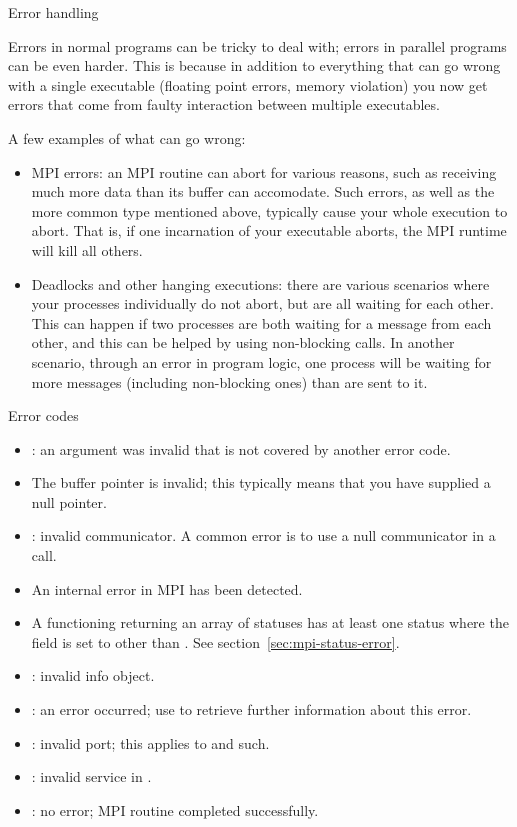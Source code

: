  {Error handling}
\label{sec:mpi:error}

Errors in normal programs can be tricky to deal with; errors in
parallel programs can be even harder. This is because in addition to
everything that can go wrong with a single executable (floating point
errors, memory violation) you now get errors that come from faulty
interaction between multiple executables.

A few examples of what can go wrong:
\begin{itemize}
\item MPI errors: an MPI routine can abort for various reasons, such
  as receiving much more data than its buffer can accomodate. Such
  errors, as well as the more common type mentioned above, typically
  cause your whole execution to abort. That is, if one incarnation of
  your executable aborts, the MPI runtime will kill all others.
\item Deadlocks and other hanging executions: there are various
  scenarios where your processes individually do not abort, but are all
  waiting for each other. This can happen if two processes are both
  waiting for a message from each other, and this can be helped by
  using non-blocking calls. In another scenario, through an error in
  program logic, one process will be waiting for more messages
  (including non-blocking ones) than are sent to it.
\end{itemize}

 {Error codes}
\label{sec:mpi-err-codes}

\begin{itemize}
\item {}: an argument was invalid that is not
  covered by another error code.
\item {} The buffer pointer is invalid;
  this typically means that you have supplied a null pointer.
\item {}: 
  invalid communicator. A common error is to use a null communicator in
  a call.
\item {} An internal error in MPI has been detected.
\item {} A functioning returning an array of statuses
  has at least one status where the  field is set
  to other than . See section~\ref{sec:mpi-status-error}.
\item {}: 
  invalid info object.
\item {}: an error occurred; use
   to retrieve further information
  about this error.
\item {}: invalid port; this applies to
   and such.
\item {}: invalid service in
  .
\item {}: 
  no error; MPI routine completed successfully.
\end{itemize}

